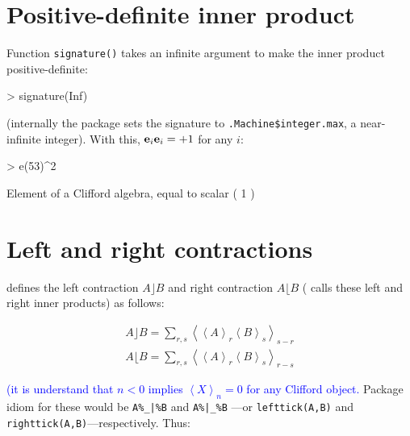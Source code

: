 \documentclass{birkjour}
\theoremstyle{definition}
\theoremstyle{remark}
\numberwithin{equation}{section}
\begin{document}
\section{Positive-definite inner product}

Function {\tt signature()} takes an infinite argument to make the
inner product positive-definite:

\begin{Schunk}
\begin{Sinput}
> signature(Inf)
\end{Sinput}
\end{Schunk}

(internally the package sets the signature to
{\tt .Machine\$integer.max}, a near-infinite integer).  With this,
${\bf e}_{i}{\bf e}_{i}=+1$ for any $i$:

\begin{Schunk}
\begin{Sinput}
> e(53)^2
\end{Sinput}
\begin{Soutput}
Element of a Clifford algebra, equal to
scalar ( 1 )
\end{Soutput}
\end{Schunk}


\section{Left and right contractions}

\cite{dorst2002} defines the left contraction $A\rfloor B$ and right
contraction $A\lfloor B$ (\cite{chisholm2012} calls these left and
right inner products) as follows:

\begin{eqnarray}
\displaystyle A\rfloor B = \sum_{r,s}\left\langle\left\langle
A\right\rangle_r\left\langle B\right\rangle_s\right\rangle_{s-r}\\
\displaystyle A\lfloor B = \sum_{r,s}\left\langle\left\langle
A\right\rangle_r\left\langle B\right\rangle_s\right\rangle_{r-s}
\end{eqnarray}

\textcolor{blue}{(it is understand that $n<0$ implies $\left\langle
  X\right\rangle_n=0$ for any Clifford object.}
Package idiom for these would be {\tt A\%\_|\%B} and {\tt A\%|\_\%B}
---or {\tt lefttick(A,B)} and {\tt righttick(A,B)}---respectively.
Thus:
\end{document}
